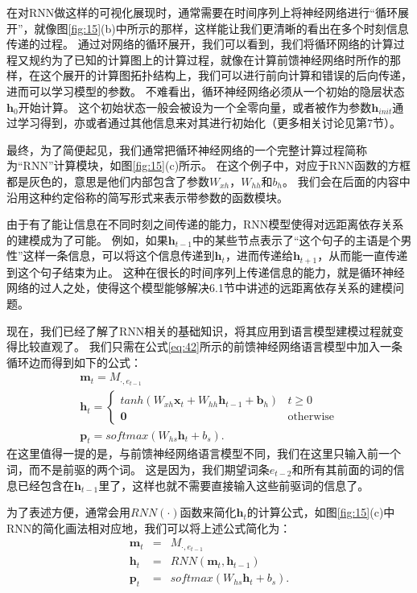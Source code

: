 \documentclass[10pt,a4paper]{ctexart}
\begin{document}
在对RNN做这样的可视化展现时，通常需要在时间序列上将神经网络进行“循环展开”，就像图\ref{fig:15}(b)中所示的那样，这样能让我们更清晰的看出在多个时刻信息传递的过程。
通过对网络的循环展开，我们可以看到，我们将循环网络的计算过程又规约为了已知的计算图上的计算过程，就像在计算前馈神经网络时所作的那样，在这个展开的计算图拓扑结构上，我们可以进行前向计算和错误的后向传递，进而可以学习模型的参数。
不难看出，循环神经网络必须从一个初始的隐层状态$\textbf{h}_0$开始计算。
这个初始状态一般会被设为一个全零向量，或者被作为参数$\textbf{h}_{init}$通过学习得到，亦或者通过其他信息来对其进行初始化（更多相关讨论见第7节）。

最终，为了简便起见，我们通常把循环神经网络的一个完整计算过程简称为“RNN”计算模块，如图\ref{fig:15}(c)所示。
在这个例子中，对应于RNN函数的方框都是灰色的，意思是他们内部包含了参数$W_{xh}$，$W_{hh}$和$b_h$。
我们会在后面的内容中沿用这种约定俗称的简写形式来表示带参数的函数模块。

由于有了能让信息在不同时刻之间传递的能力，RNN模型使得对远距离依存关系的建模成为了可能。
例如，如果$\textbf{h}_{t-1}$中的某些节点表示了“这个句子的主语是个男性”这样一条信息，可以将这个信息传递到$\textbf{h}_t$，进而传递给$\textbf{h}_{t+1}$，从而能一直传递到这个句子结束为止。
这种在很长的时间序列上传递信息的能力，就是循环神经网络的过人之处，使得这个模型能够解决6.1节中讲述的远距离依存关系的建模问题。

现在，我们已经了解了RNN相关的基础知识，将其应用到语言模型建模过程就变得比较直观了\cite{mikolov2010recurrent}。
我们只需在公式\ref{eq:42}所示的前馈神经网络语言模型中加入一条循环边而得到如下的公式：
\begin{equation}\label{eq:45}
 \begin{array}{l}
 \textbf{m}_t = M_{\cdot,e_{t-1}} \\
 \textbf{h}_t = \left\{ \begin{array}{ll}
  tanh(W_{xh}\textbf{x}_t + W_{hh}\textbf{h}_{t-1}+\textbf{b}_h) & t \geq 0 \\
  \textbf{0} & \textrm{otherwise}
  \end{array} \right. \\
 \textbf{p}_t = softmax(W_{hs}\textbf{h}_t + b_s).
 \end{array}
\end{equation}
在这里值得一提的是，与前馈神经网络语言模型不同，我们在这里只输入前一个词，而不是前驱的两个词。
这是因为，我们期望词条$e_{t-2}$和所有其前面的词的信息已经包含在$\textbf{h}_{t-1}$里了，这样也就不需要直接输入这些前驱词的信息了。

为了表述方便，通常会用$RNN(\cdot)$函数来简化$\textbf{h}_t$的计算公式，如图\ref{fig:15}(c)中RNN的简化画法相对应地，我们可以将上述公式简化为：
\begin{eqnarray}
 \textbf{m}_t & = & M_{\cdot,e_{t-1}} \nonumber \\
 \textbf{h}_t & = & RNN(\textbf{m}_t, \textbf{h}_{t-1}) \nonumber \\
 \textbf{p}_t & = & softmax(W_{hs}\textbf{h}_t + b_s). \label{eq:46}
\end{eqnarray}
\end{document}

